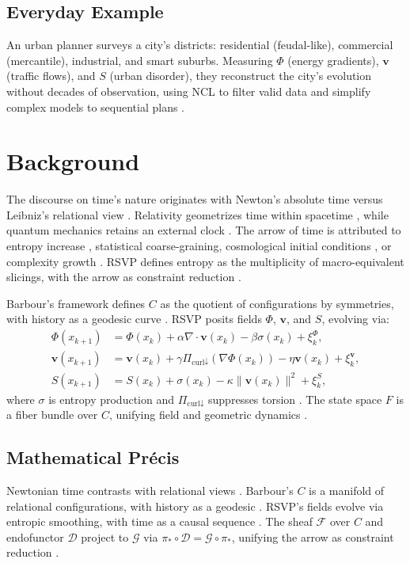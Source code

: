 \documentclass[11pt]{article}
\theoremstyle{plain}
\theoremstyle{definition}
\begin{document}
\subsection{Everyday Example}
An urban planner surveys a city’s districts: residential (feudal-like), commercial (mercantile), industrial, and smart suburbs. Measuring $\Phi$ (energy gradients), $\mathbf{v}$ (traffic flows), and $S$ (urban disorder), they reconstruct the city’s evolution without decades of observation, using NCL to filter valid data and simplify complex models to sequential plans \citep{Jaynes1957}.

\section{Background}
The discourse on time’s nature originates with Newton’s absolute time versus Leibniz’s relational view \citep{Barbour1999}. Relativity geometrizes time within spacetime \citep{Rovelli2015}, while quantum mechanics retains an external clock \citep{Ellis2012}. The arrow of time is attributed to entropy increase \citep{Jaynes1957}, statistical coarse-graining, cosmological initial conditions \citep{Ellis2012}, or complexity growth \citep{Barbour2014}. RSVP defines entropy as the multiplicity of macro-equivalent slicings, with the arrow as constraint reduction \citep{Jaynes1957}.

Barbour’s framework defines $C$ as the quotient of configurations by symmetries, with history as a geodesic curve \citep{Barbour1999}. RSVP posits fields $\Phi$, $\mathbf{v}$, and $S$, evolving via:
\begin{align}
\Phi(x_{k+1}) &= \Phi(x_k) + \alpha \nabla \cdot \mathbf{v}(x_k) - \beta \sigma(x_k) + \xi^\Phi_k, \\
\mathbf{v}(x_{k+1}) &= \mathbf{v}(x_k) + \gamma \Pi_{\text{curl}\downarrow}(\nabla \Phi(x_k)) - \eta \mathbf{v}(x_k) + \xi^{\mathbf{v}}_k, \\
S(x_{k+1}) &= S(x_k) + \sigma(x_k) - \kappa \|\mathbf{v}(x_k)\|^2 + \xi^S_k,
\end{align}
where $\sigma$ is entropy production and $\Pi_{\text{curl}\downarrow}$ suppresses torsion \citep{Catren2013}. The state space $F$ is a fiber bundle over $C$, unifying field and geometric dynamics \citep{Baas2015, Prigogine1997}.

\subsection{Mathematical Précis}
Newtonian time contrasts with relational views \citep{Barbour1999}. Barbour’s $C$ is a manifold of relational configurations, with history as a geodesic \citep{Barbour2014}. RSVP’s fields evolve via entropic smoothing, with time as a causal sequence \citep{Baas2015}. The sheaf $\mathscr{F}$ over $C$ and endofunctor $\mathcal{D}$ project to $\mathcal{G}$ via $\pi_* \circ \mathcal{D} = \mathcal{G} \circ \pi_*$, unifying the arrow as constraint reduction \citep{Isham2003, Jaynes1957}.
\end{document}
